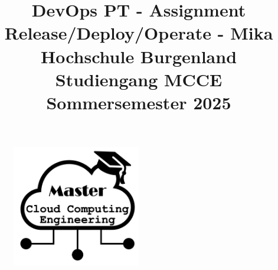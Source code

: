 \begin{figure}
    \centering
    \includegraphics[width=0.5\textwidth]{fig/Fig1.png}
    \label{fig:title-image}
\end{figure}


\title{
    DevOps PT - Assignment Release/Deploy/Operate - Mika \\
    \vspace{0.5cm}
    \large{Hochschule Burgenland} \\
    \large{Studiengang MCCE} \\
    \large{Sommersemester 2025}
}
